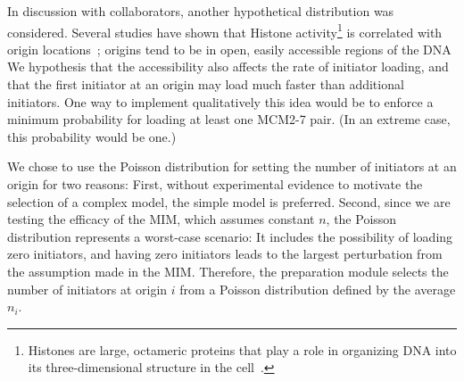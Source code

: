 		In discussion with collaborators, another hypothetical distribution was considered.
		Several studies have shown that Histone activity\footnote{
		Histones are large, octameric proteins that play a role in organizing DNA into its three-dimensional structure in the cell~\cite{MolecularCellBiology}.}
		is correlated with origin locations~\cite{Histone,Histone2,Histone3}; origins tend to be in open, easily accessible regions of the DNA
		We hypothesis that the accessibility also affects the rate of initiator loading, and that the first initiator at an origin may load much faster than additional initiators.
		One way to implement qualitatively this idea would be to enforce a minimum probability for loading at least one MCM2-7 pair.
		(In an extreme case, this probability would be one.)
		
		We chose to use the Poisson distribution for setting the number of initiators at an origin for two reasons:
		First, without experimental evidence to motivate the selection of a complex model, the simple model is preferred.
		Second, since we are testing the efficacy of the MIM, which assumes constant $n$, the Poisson distribution represents a worst-case scenario:
		It includes the possibility of loading zero initiators, and having zero initiators leads to the largest perturbation from the assumption made in the MIM.
		Therefore, the preparation module selects the number of initiators at origin $i$ from a Poisson distribution defined by the average $n_i$.
		
